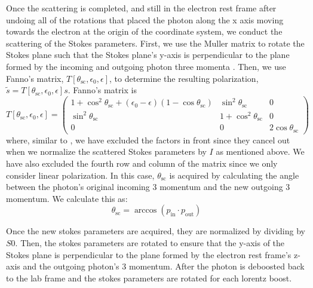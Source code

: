 \documentclass[12pt,a4paper]{article}
\begin{document}
Once the scattering is completed, and still in the electron rest frame after undoing all of the rotations that placed the photon along the x axis moving towards the electron at the origin of the coordinate system, we conduct the scattering of the Stokes parameters. First, we use the Muller matrix to rotate the Stokes plane such that the Stokes plane's y-axis is perpendicular to the plane formed by the incoming and outgoing photon three momenta \citep{McMaster:1961aa, lundman2014polarization}. Then, we use Fanno's matrix, $T[\theta_{\mathrm{sc}},\epsilon_{0}, \epsilon]$, \citep{McMaster:1961aa} to determine the resulting polarization, $\tilde{s}=T[\theta_{\mathrm{sc}},\epsilon_{0}, \epsilon]s$. Fanno's matrix is 
\begin{equation}
T[\theta_{\mathrm{sc}},\epsilon_{0}, \epsilon]=  \left(\begin{array}{lll}{1+\cos ^{2} \theta_{\mathrm{sc}}+\left(\epsilon_{0}-\epsilon \right)\left(1-\cos \theta_{\mathrm{sc}}\right)} & {\sin ^{2} \theta_{\mathrm{sc}}} & {0} \\ {\sin ^{2} \theta_{\mathrm{sc}}} & {1+\cos ^{2} \theta_{\mathrm{sc}}} & {0} \\ {0} & {0} & {2 \cos \theta_{\mathrm{sc}}}\end{array}\right)
\end{equation}
where, similar to \cite{krawczynski2011polarization},  we have excluded the factors in front since they cancel out when we normalize the scattered Stokes parameters by $I$ as mentioned above. We have also excluded the fourth row and column of the matrix since we only consider linear polarization. In this case, $\theta_{\mathrm{sc}}$ is acquired by calculating the angle between the photon's original incoming 3 momentum and the new outgoing 3 momentum. We calculate this as:
\begin{equation}
\theta_{\mathrm{sc}}=\arccos(p_\mathrm{in} \cdot p_\mathrm{out})
\end{equation}

Once the new stokes parameters are acquired, they are normalized by dividing by $S0$. Then, the stokes parameters are rotated to ensure that the y-axis of the Stokes plane is perpendicular to the plane formed by the electron rest frame's z-axis and the outgoing photon's 3 momentum. After the photon is deboosted back to the lab frame and the stokes parameters are rotated for each lorentz boost.
\end{document}
